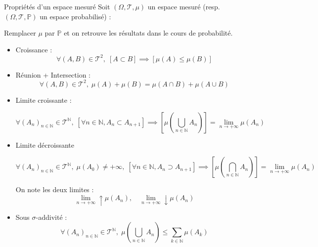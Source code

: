 \begin{Prop}{Propriétés d'un espace mesuré}{}
Soit $(\Omega, \mathcal{T},\mu)$ un espace mesuré (resp. $(\Omega, \mathcal{T}, \mathbb{P})$ un espace probabilisé) : 

\begin{note}{}{}
Remplacer $\mu$ par $\mathbb{P}$ et on retrouve les résultats dans le cours de probabilité.
\end{note}


\begin{itemize}

    \item Croissance : 
      \begin{equation}
        \forall (A, B) \in \mathcal{T} ^{2}, \; [A \subset B] \implies [\mu(A) \le \mu(B)]
      \end{equation}

    \item Réunion + Intersection : 
      \begin{equation}
        \forall (A, B) \in \mathcal{T} ^{2}, \; \mu(A) + \mu(B) = \mu(A \cap B) + \mu (A \cup B)
      \end{equation} 

    \item Limite croissante : 

      \begin{equation}
        \forall (A_n) _{n \in \mathbb{N}} \in \mathcal{T} ^{\mathbb{N}}, \; [\forall n \in \mathbb{N}, A_n \subset A _{n+1}] \implies \left[ \mu \left( \bigcup _{n\in \mathbb{N}} A_n \right)\right] = \lim _{n \to + \infty} \mu (A_n)
      \end{equation}

    \item Limite décroissante 

      \begin{equation}
        \forall (A_n) _{n \in \mathbb{N}} \in \mathcal{T} ^{\mathbb{N}}, \; \mu(A_0) \ne + \infty, \; [\forall n \in \mathbb{N}, A_n \supset A _{n+1}] \implies \left[ \mu \left( \bigcap _{n\in \mathbb{N}} A_n \right)\right] = \lim _{n \to + \infty} \mu (A_n)
      \end{equation}



      \begin{tcolorbox}
        On note les deux limites : 
        \begin{equation}
          \lim _{n \to + \infty} \uparrow \mu (A_n), \quad 
          \lim _{n \to + \infty} \downarrow \mu (A_n)
          \label{eq: 2.11}
        \end{equation}
      \end{tcolorbox}
    \item Sous $\sigma$-addivité : 
      \begin{equation}
        \forall (A_n) _{n \in \mathbb{N}} \in \mathcal{T} ^{\mathbb{N}}, \; \mu \left( \bigcup _{n \in \mathbb{N}} A_n\right) \le \sum_{k \in \mathbb{N}}^{} \mu(A_k)
      \end{equation}

\end{itemize}
\end{Prop}

